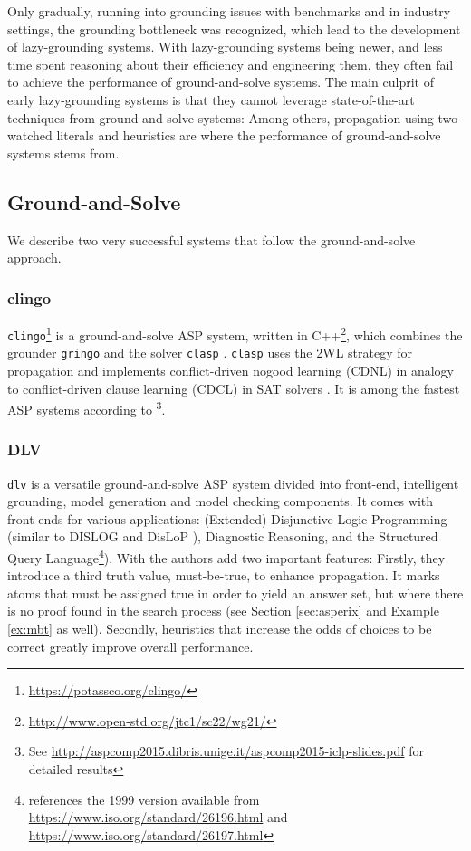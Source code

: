 \documentclass{vutinfth} %
\newcommand{\mbt}{must-be-true\xspace}
\newcommand{\clasp}{\texttt{clasp}\xspace}
\newcommand{\dlv}{\texttt{dlv}\xspace}
\begin{document}
Only gradually, running into grounding issues with benchmarks and in industry settings, the grounding bottleneck was recognized, which lead to the development of lazy-grounding systems. With lazy-grounding systems being newer, and less time spent reasoning about their efficiency and engineering them, they often fail to achieve the performance of ground-and-solve systems. The main culprit of early lazy-grounding systems is that they cannot leverage state-of-the-art techniques from ground-and-solve systems: Among others, propagation using two-watched literals and heuristics are where the performance of ground-and-solve systems stems from.

\subsection{Ground-and-Solve}

We describe two very successful systems that follow the ground-and-solve approach.

\subsubsection{clingo}

\texttt{clingo}\footnote{\url{https://potassco.org/clingo/}} is a ground-and-solve ASP system, written in C++\footnote{\url{http://www.open-std.org/jtc1/sc22/wg21/}}, which combines the grounder \texttt{gringo} and the solver \texttt{clasp} \cite{clasp-first}. \clasp uses the 2WL strategy for propagation \cite[Sec.~5.3]{clasp} and implements conflict-driven nogood learning (CDNL) \cite[Sec.~4.1]{clasp} in analogy to conflict-driven clause learning (CDCL) in SAT solvers \cite{grasp,cdl-sat}. It is among the fastest ASP systems according to \cite{aspcomp2015}\footnote{See \url{http://aspcomp2015.dibris.unige.it/aspcomp2015-iclp-slides.pdf} for detailed results}.

\subsubsection{DLV}
\label{sec:dlv}

\dlv \cite{dlv} is a versatile ground-and-solve ASP system divided into front-end, intelligent grounding, model generation and model checking components. It comes with front-ends for various applications: (Extended) Disjunctive Logic Programming \cite{dlp} (similar to DISLOG \cite{dislog} and DisLoP \cite{dislop}), Diagnostic Reasoning, and the Structured Query Language\footnote{\cite{dlv} references the 1999 version available from \url{https://www.iso.org/standard/26196.html} and \url{https://www.iso.org/standard/26197.html}}). With \cite{dlv-mbt} the authors add two important features: Firstly, they introduce a third truth value, \mbt, to enhance propagation. It marks atoms that must be assigned true in order to yield an answer set, but where there is no proof found in the search process (see Section \ref{sec:asperix} and Example \ref{ex:mbt} as well). Secondly, heuristics that increase the odds of choices to be correct greatly improve overall performance.
\end{document}
